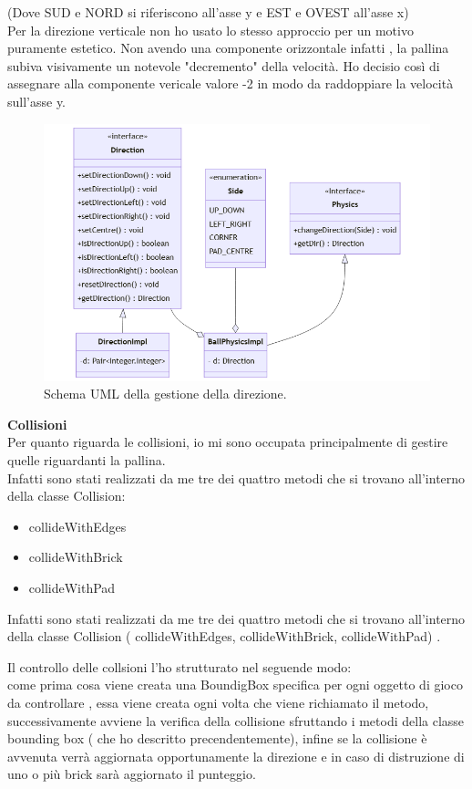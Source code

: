 \documentclass[a4paper,12pt]{report}
\begin{document}
(Dove SUD e NORD si riferiscono all'asse y e EST e OVEST all'asse x)
\\Per la direzione verticale non ho usato lo stesso approccio per un motivo puramente estetico. Non avendo una componente orizzontale infatti , la pallina subiva visivamente un notevole "decremento" della velocità. Ho decisio così di assegnare alla componente vericale valore -2 in modo da raddoppiare la velocità sull'asse y.
\begin{figure}[H]
    \centering{}
    \includegraphics[scale=0.6]{images/Physics.png}
    \caption{Schema UML della gestione della direzione.}
    \label{images:Physics}
\end{figure}
\textbf{Collisioni}\\
Per quanto riguarda le collisioni, io mi sono occupata principalmente di gestire quelle riguardanti la pallina.
\\ Infatti sono stati realizzati da me tre dei quattro metodi che si trovano all'interno della classe Collision:
\begin{itemize}
    \item  collideWithEdges
    \item collideWithBrick
    \item collideWithPad

\end{itemize}
Infatti sono stati realizzati da me tre dei quattro metodi che si trovano all'interno della classe Collision ( collideWithEdges, collideWithBrick, collideWithPad) .

Il controllo delle collsioni l'ho strutturato nel seguende modo:
\\ come prima cosa viene creata una BoundigBox specifica per ogni oggetto di gioco da controllare , essa viene creata ogni volta che viene richiamato il metodo, successivamente avviene la verifica della collisione sfruttando i metodi della classe bounding box ( che ho descritto precendentemente), infine se la collisione è avvenuta verrà aggiornata opportunamente la direzione e in caso di distruzione di uno o più brick sarà aggiornato il punteggio.
\end{document}
